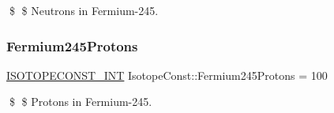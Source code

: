 \$ \$ Neutrons in Fermium-\/245. \mbox{\label{group___isotope_const-_fermium-_fm245_gac24d5381fe253c476b0469c58ee0009f}} 
\subsubsection{\texorpdfstring{Fermium245\+Protons}{Fermium245Protons}}
{\footnotesize\ttfamily \mbox{\hyperlink{group___isotope_const-_macros_ga5f18360b3e99483a35c32d789e62621c}{I\+S\+O\+T\+O\+P\+E\+C\+O\+N\+S\+T\+\_\+\+I\+NT}} Isotope\+Const\+::\+Fermium245\+Protons = 100}

\$ \$ Protons in Fermium-\/245. 